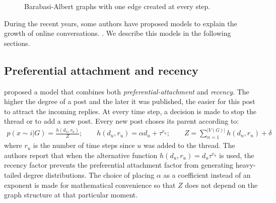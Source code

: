 \documentclass[smallextended]{svjour3}          %
\begin{document}
\begin{figure}
	\centering
	\caption{Barabasi-Albert graphs with one edge created at every step.}
	\label{fig:Barabasi-Albert}
\end{figure}



During the recent years, some authors have proposed models to explain the growth of online conversations. \citep{Kumar2010, Gomez2010, Wang2012e, Gomez2012a}. We describe this models in the following sections.

\subsection{Preferential attachment and recency}
\cite{Kumar2010} proposed a model that combines both \textit{preferential-attachment} and \textit{recency}. The higher the degree of a post and the later it was published, the easier for this post to attract the incoming replies. At every time step, a decision is made to stop the thread or to add a new post. Every new post choses its parent according to:
\begin{align}
p(x\sim i | G) = \frac{h(d_u, r_u)}{Z}; \qquad h(d_u, r_u) =\alpha d_u + \tau^{r_u} ; \qquad Z = \sum_{n=1}^{|V(G)|} h(d_n, r_n) + \delta
\end{align}
where $r_u$ is the number of time steps since $u$ was added to the thread. The authors report that when the alternative function $h(d_u, r_u) = d_u \tau^{r_u}$ is used, the recency factor prevents the preferential attachment factor from generating heavy-tailed degree distributions. The choice of placing $\alpha$ as a coefficient instead of an exponent is made for mathematical convenience so that $Z$ does not depend on the graph structure at that particular moment.
\end{document}
